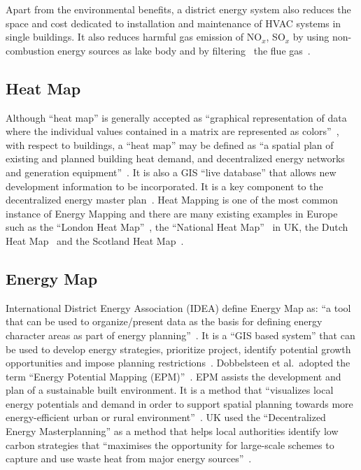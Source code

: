 Apart from the environmental benefits, a district energy system also
reduces the space and cost dedicated to installation and maintenance
of HVAC systems in single buildings. It also reduces harmful gas
emission of NO$_x$, SO$_x$ by using non-combustion energy sources as
lake body and by filtering~\cite{IDEA2012} the flue
gas~\cite{veolia2014}.

\subsection{Heat Map}
Although ``heat map'' is generally accepted as ``graphical
representation of data where the individual values contained in a
matrix are represented as colors''~\cite{HeatmapWiki}, with respect to
buildings, a ``heat map'' may be defined as ``a spatial plan of
existing and planned building heat demand, and decentralized energy
networks and generation equipment''~\cite{decentralHeatMap2011}. It is
also a GIS ``live database'' that allows new development information
to be incorporated. It is a key component to the decentralized energy
master plan~\cite{decentralHeatMap2011}. Heat Mapping is one of the
most common instance of Energy Mapping and there are many existing
examples in Europe such as the ``London Heat
Map''~\cite{londonHeatMap}, the ``National Heat
Map''~\cite{heatMap2015} in UK, the Dutch Heat
Map~\cite{Dobbelsteen2013} and the Scotland Heat
Map~\cite{scotlandHeatmap}.

\subsection{Energy Map}
International District Energy Association (IDEA) define Energy Map as:
``a tool that can be used to organize/present data as the basis for
defining energy character areas as part of energy
planning''~\cite{IDEA2012}. It is a ``GIS based system'' that can be
used to develop energy strategies, prioritize project, identify
potential growth opportunities and impose planning
restrictions~\cite{IDEA2012}. Dobbelsteen et al.\ adopted the term
``Energy Potential Mapping (EPM)''~\cite{Dobbelsteen2013}. EPM assists
the development and plan of a sustainable built environment. It is a
method that ``visualizes local energy potentials and demand in order
to support spatial planning towards more energy-efficient urban or
rural environment''~\cite{Dobbelsteen2013}. UK used the
``Decentralized Energy Masterplanning'' as a method that helps local
authorities identify low carbon strategies that ``maximises the
opportunity for large-scale schemes to capture and use waste heat from
major energy sources''~\cite{decentralHeatMap2011}.

